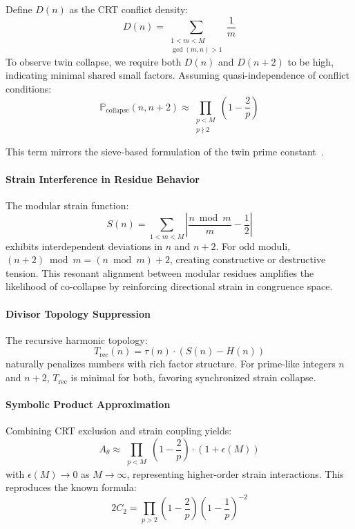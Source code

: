 \documentclass[11pt]{article}
\begin{document}
Define \( D(n) \) as the CRT conflict density:
\[
D(n) = \sum_{\substack{1 < m < M \\ \gcd(m, n) > 1}} \frac{1}{m}
\]
To observe twin collapse, we require both \( D(n) \) and \( D(n+2) \) to be high, indicating minimal shared small factors. Assuming quasi-independence of conflict conditions:
\[
\mathbb{P}_{\text{collapse}}(n, n+2) \approx \prod_{\substack{p < M \\ p \nmid 2}} \left(1 - \frac{2}{p} \right)
\]

This term mirrors the sieve-based formulation of the twin prime constant~\cite{montgomery}.

\paragraph{Strain Interference in Residue Behavior}

The modular strain function:
\[
S(n) = \sum_{1 < m < M} \left| \frac{n \bmod m}{m} - \frac{1}{2} \right|
\]
exhibits interdependent deviations in \( n \) and \( n+2 \). For odd moduli, \( (n+2) \bmod m = (n \bmod m) + 2 \), creating constructive or destructive tension. This resonant alignment between modular residues amplifies the likelihood of co-collapse by reinforcing directional strain in congruence space.

\paragraph{Divisor Topology Suppression}

The recursive harmonic topology:
\[
T_{\text{rec}}(n) = \tau(n) \cdot \left( S(n) - H(n) \right)
\]
naturally penalizes numbers with rich factor structure. For prime-like integers \( n \) and \( n+2 \), \( T_{\text{rec}} \) is minimal for both, favoring synchronized strain collapse.

\paragraph{Symbolic Product Approximation}

Combining CRT exclusion and strain coupling yields:
\[
A_\theta \approx \prod_{\substack{p < M}} \left(1 - \frac{2}{p} \right) \cdot \left(1 + \epsilon(M) \right)
\]
with \( \epsilon(M) \to 0 \) as \( M \to \infty \), representing higher-order strain interactions. This reproduces the known formula:
\[
2C_2 = \prod_{p > 2} \left(1 - \frac{2}{p} \right) \left(1 - \frac{1}{p} \right)^{-2}
\]
\end{document}
